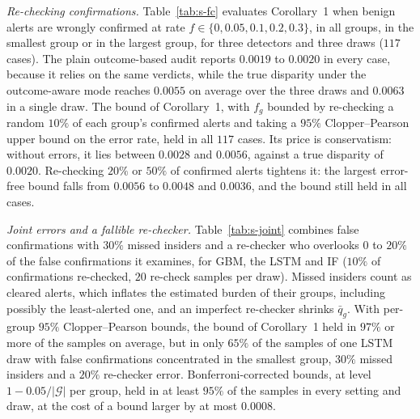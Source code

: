 \documentclass[10pt,onecolumn,letterpaper]{article}
\newcommand{\G}{\mathcal{G}}
\begin{document}
\emph{Re-checking confirmations.} Table~\ref{tab:s-fc} evaluates Corollary~1 when benign alerts are wrongly confirmed at rate $f\in\{0,0.05,0.1,0.2,0.3\}$, in all groups, in the smallest group or in the largest group, for three detectors and three draws ($117$ cases). The plain outcome-based audit reports $0.0019$ to $0.0020$ in every case, because it relies on the same verdicts, while the true disparity under the outcome-aware mode reaches $0.0055$ on average over the three draws and $0.0063$ in a single draw. The bound of Corollary~1, with $f_g$ bounded by re-checking a random $10\%$ of each group's confirmed alerts and taking a $95\%$ Clopper--Pearson upper bound on the error rate, held in all $117$ cases. Its price is conservatism: without errors, it lies between $0.0028$ and $0.0056$, against a true disparity of $0.0020$. Re-checking $20\%$ or $50\%$ of confirmed alerts tightens it: the largest error-free bound falls from $0.0056$ to $0.0048$ and $0.0036$, and the bound still held in all cases.

\emph{Joint errors and a fallible re-checker.} Table~\ref{tab:s-joint} combines false confirmations with $30\%$ missed insiders and a re-checker who overlooks $0$ to $20\%$ of the false confirmations it examines, for GBM, the LSTM and IF ($10\%$ of confirmations re-checked, $20$ re-check samples per draw). Missed insiders count as cleared alerts, which inflates the estimated burden of their groups, including possibly the least-alerted one, and an imperfect re-checker shrinks $\bar q_g$. With per-group $95\%$ Clopper--Pearson bounds, the bound of Corollary~1 held in $97\%$ or more of the samples on average, but in only $65\%$ of the samples of one LSTM draw with false confirmations concentrated in the smallest group, $30\%$ missed insiders and a $20\%$ re-checker error. Bonferroni-corrected bounds, at level $1-0.05/|\G|$ per group, held in at least $95\%$ of the samples in every setting and draw, at the cost of a bound larger by at most $0.0008$.
\end{document}
